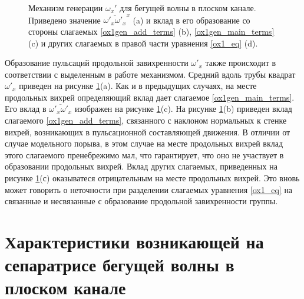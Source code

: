 \begin{figure}
\caption{Механизм генерации $\omega_x'$ для бегущей волны в плоском канале. Приведено значение $\overline{\omega'_x \omega'_x}^x$ (a) и вклад в его образование со стороны слагаемых \eqref{ox1gen_add_terms} (b), \eqref{ox1gen_main_terms} (c) и других слагаемых в правой части уравнения \eqref{ox1_eq} (d).}
\label{duct_turb_tw_ox1gen_pic}
\end{figure}

Образование пульсаций продольной завихренности $\omega'_x$ также происходит в соответствии с выделенным в работе механизмом. Средний вдоль трубы квадрат $\omega'_x$ приведен на рисунке \ref{duct_turb_tw_ox1gen_pic}(a). Как и в предыдущих случаях, на месте продольных вихрей определяющий вклад дает слагаемое \eqref{ox1gen_main_terms}. Его вклад в $\overline{\omega'_x \omega'_x}$ изображен на рисунке  \ref{duct_turb_tw_ox1gen_pic}(c). На рисунке \ref{duct_turb_tw_ox1gen_pic}(b) приведен вклад слагаемого \eqref{ox1gen_add_terms}, связанного с наклоном нормальных к стенке вихрей, возникающих в пульсационной составляющей движения. В отличии от случае модельного порыва, в этом случае на месте продольных вихрей вклад этого слагаемого пренебрежимо мал, что гарантирует, что оно не участвует в образовании продольных вихрей. Вклад других слагаемых, приведенных на рисунке \ref{duct_turb_tw_ox1gen_pic}(с) оказыватеся отрицательным на месте продольных вихрей. Это вновь может говорить о неточности при разделении слагаемых уравнения \eqref{ox1_eq} на связанные и несвязанные с образование продольной завихренности группы.


\section{Характеристики возникающей на сепаратрисе бегущей волны в плоском канале}

